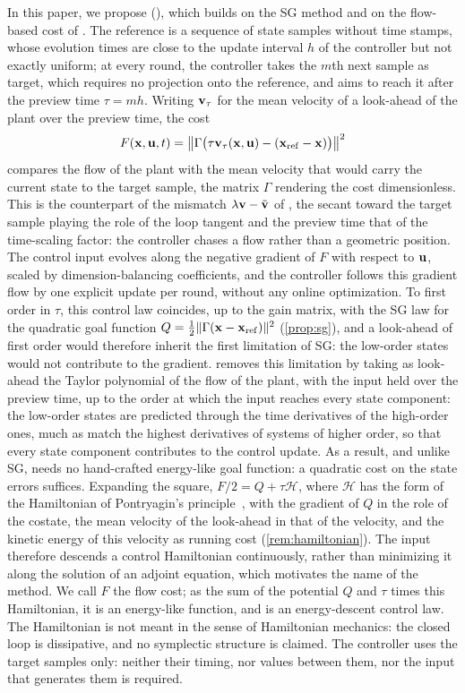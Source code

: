 In this paper, we propose \methodlong{} (\method{}), which builds on the SG method and on the
flow-based cost of \citet{lan2004variational}.
The reference is a sequence of state samples without time stamps, whose evolution times are close
to the update interval $h$ of the controller but not exactly uniform; at every round, the controller
takes the $m$th next sample as target, which requires no projection onto the reference, and aims to
reach it after the preview time $\tau = mh$.
Writing $\bv_\tau$ for the mean velocity of a look-ahead of the plant over the preview time, the cost
\[
    F(\bx,\bu,t) = \norm[\big]{\Gamma\bigl(\tau\bv_\tau(\bx,\bu) - (\bxref - \bx)\bigr)}^2
\]
compares the flow of the plant with the mean velocity that would carry the current state to the
target sample, the matrix $\Gamma$ rendering the cost dimensionless.
This is the counterpart of the mismatch $\lambda\bv - \tilde{\bv}$ of \citet{lan2004variational}, the
secant toward the target sample playing the role of the loop tangent and the preview time that of
the time-scaling factor: the controller chases a flow rather than a geometric position.
The control input evolves along the negative gradient of $F$ with respect to $\bu$, scaled by
dimension-balancing coefficients, and the controller follows this gradient flow by one explicit
update per round, without any online optimization.
To first order in $\tau$, this control law coincides, up to the gain matrix, with the SG law for the
quadratic goal function $Q = \frac{1}{2}\norm{\Gamma(\bx - \bxref)}^2$ (\cref{prop:sg}), and a
look-ahead of first order would therefore inherit the first limitation of SG: the low-order states
would not contribute to the gradient.
\method{} removes this limitation by taking as look-ahead the Taylor polynomial of the flow of the
plant, with the input held over the preview time, up to the order at which the input reaches every
state component: the low-order states are predicted through the time derivatives of the high-order
ones, much as \citet{lan2004variational} match the highest derivatives of systems of higher order,
so that every state component contributes to the control update.
As a result, and unlike SG, \method{} needs no hand-crafted energy-like goal function: a quadratic
cost on the state errors suffices.
Expanding the square, $F/2 = Q + \tau\mathcal{H}$, where $\mathcal{H}$ has the form of the Hamiltonian
of Pontryagin's principle~\citep{pontryagin1962mathematical}, with the gradient of $Q$ in the role of
the costate, the mean velocity of the look-ahead in that of the velocity, and the kinetic energy of
this velocity as running cost (\cref{rem:hamiltonian}).
The input therefore descends a control Hamiltonian continuously, rather than minimizing it along the
solution of an adjoint equation, which motivates the name of the method.
We call $F$ the flow cost; as the sum of the potential $Q$ and $\tau$ times this Hamiltonian, it is an
energy-like function, and \method{} is an energy-descent control law.
The Hamiltonian is not meant in the sense of Hamiltonian mechanics: the closed loop is dissipative,
and no symplectic structure is claimed.
The controller uses the target samples only: neither their timing, nor values between them, nor
the input that generates them is required.

